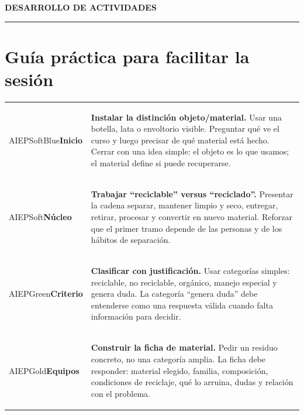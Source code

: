 ﻿\documentclass[10pt,a4paper]{article}
\newcommand{\kicker}[1]{%
  {\color{AIEPRed}\scriptsize\bfseries\MakeUppercase{#1}}\par\vspace{2.5mm}
  {\color{AIEPRed}\rule{13mm}{1.2pt}}\vspace{3mm}
}
\newcommand{\pagebreaksection}{\newpage}
\begin{document}
\pagebreaksection

\kicker{Desarrollo de actividades}
\section*{Guía práctica para facilitar la sesión}

\begin{tabularx}{\textwidth}{L{25mm}Y}
\begin{softcard}[height=24mm,valign=center]{AIEPSoftBlue}\centering\bfseries Inicio\end{softcard}
&
\begin{card}[height=24mm,valign=top]
\textbf{Instalar la distinción objeto/material.} Usar una botella, lata o envoltorio visible. Preguntar qué ve el curso y luego precisar de qué material está hecho. Cerrar con una idea simple: el objeto es lo que usamos; el material define si puede recuperarse.
\end{card}
\\[2mm]
\begin{softcard}[height=24mm,valign=center]{AIEPSoft}\centering\bfseries Núcleo\end{softcard}
&
\begin{card}[height=24mm,valign=top]
\textbf{Trabajar ``reciclable'' versus ``reciclado''.} Presentar la cadena separar, mantener limpio y seco, entregar, retirar, procesar y convertir en nuevo material. Reforzar que el primer tramo depende de las personas y de los hábitos de separación.
\end{card}
\\[2mm]
\begin{softcard}[height=24mm,valign=center]{AIEPGreen}\centering\bfseries Criterio\end{softcard}
&
\begin{card}[height=24mm,valign=top]
\textbf{Clasificar con justificación.} Usar categorías simples: reciclable, no reciclable, orgánico, manejo especial y genera duda. La categoría ``genera duda'' debe entenderse como una respuesta válida cuando falta información para decidir.
\end{card}
\\[2mm]
\begin{softcard}[height=24mm,valign=center]{AIEPGold}\centering\bfseries Equipos\end{softcard}
&
\begin{card}[height=24mm,valign=top]
\textbf{Construir la ficha de material.} Pedir un residuo concreto, no una categoría amplia. La ficha debe responder: material elegido, familia, composición, condiciones de reciclaje, qué lo arruina, dudas y relación con el problema.

\end{card}
\end{tabularx}
\end{document}
